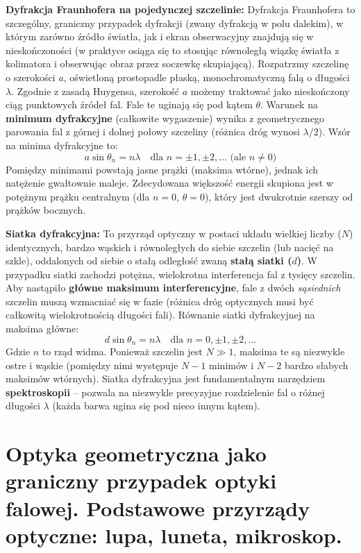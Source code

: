 \documentclass[11pt, a4paper]{article}
\begin{document}
\textbf{Dyfrakcja Fraunhofera na pojedynczej szczelinie:}
Dyfrakcja Fraunhofera to szczególny, graniczny przypadek dyfrakcji (zwany dyfrakcją w polu dalekim), w którym zarówno źródło światła, jak i ekran obserwacyjny znajdują się w nieskończoności (w praktyce osiąga się to stosując równoległą wiązkę światła z kolimatora i obserwując obraz przez soczewkę skupiającą).
Rozpatrzmy szczelinę o szerokości $a$, oświetloną prostopadle płaską, monochromatyczną falą o długości $\lambda$. Zgodnie z zasadą Huygensa, szerokość $a$ możemy traktować jako nieskończony ciąg punktowych źródeł fal. Fale te uginają się pod kątem $\theta$. Warunek na \textbf{minimum dyfrakcyjne} (całkowite wygaszenie) wynika z geometrycznego parowania fal z górnej i dolnej połowy szczeliny (różnica dróg wynosi $\lambda/2$). Wzór na minima dyfrakcyjne to:
\[
a \sin\theta_n = n\lambda \quad \text{dla } n = \pm 1, \pm 2, \dots \text{ (ale } n \neq 0\text{)}
\]
Pomiędzy minimami powstają jasne prążki (maksima wtórne), jednak ich natężenie gwałtownie maleje. Zdecydowana większość energii skupiona jest w potężnym prążku centralnym (dla $n=0$, $\theta=0$), który jest dwukrotnie szerszy od prążków bocznych.

\textbf{Siatka dyfrakcyjna:}
To przyrząd optyczny w postaci układu wielkiej liczby ($N$) identycznych, bardzo wąskich i równoległych do siebie szczelin (lub nacięć na szkle), oddalonych od siebie o stałą odległość zwaną \textbf{stałą siatki ($d$)}.
W przypadku siatki zachodzi potężna, wielokrotna interferencja fal z tysięcy szczelin. Aby nastąpiło \textbf{główne maksimum interferencyjne}, fale z dwóch \textit{sąsiednich} szczelin muszą wzmacniać się w fazie (różnica dróg optycznych musi być całkowitą wielokrotnością długości fali). Równanie siatki dyfrakcyjnej na maksima główne:
\[
d \sin\theta_n = n\lambda \quad \text{dla } n = 0, \pm 1, \pm 2, \dots
\]
Gdzie $n$ to rząd widma. Ponieważ szczelin jest $N \gg 1$, maksima te są niezwykle ostre i wąskie (pomiędzy nimi występuje $N-1$ minimów i $N-2$ bardzo słabych maksimów wtórnych). Siatka dyfrakcyjna jest fundamentalnym narzędziem \textbf{spektroskopii} – pozwala na niezwykle precyzyjne rozdzielenie fal o różnej długości $\lambda$ (każda barwa ugina się pod nieco innym kątem).

\section{Optyka geometryczna jako graniczny przypadek optyki falowej. Podstawowe przyrządy optyczne: lupa, luneta, mikroskop.}
\end{document}
